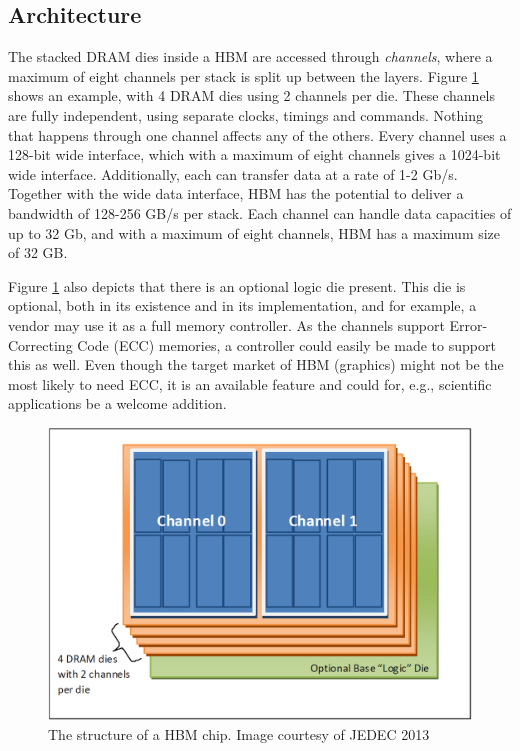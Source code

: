 \subsection{Architecture}
The stacked DRAM dies inside a HBM are accessed through \emph{channels}, where a maximum of eight channels per stack is split up between the layers. Figure \ref{HBM-structure} shows an example, with 4 DRAM dies using 2 channels per die. These channels are fully independent, using separate clocks, timings and commands. Nothing that happens through one channel affects any of the others. Every channel uses a 128-bit wide interface, which with a maximum of eight channels gives a 1024-bit wide interface. Additionally, each can transfer data at a rate of 1-2 Gb/s. Together with the wide data interface, HBM has the potential to deliver a bandwidth of 128-256 GB/s per stack. Each channel can handle data capacities of up to 32 Gb, and with a maximum of eight channels, HBM has a maximum size of 32 GB. 
\bigskip

Figure \ref{HBM-structure} also depicts that there is an optional logic die present. This die is optional, both in its existence and in its implementation, and for example, a vendor may use it as a full memory controller. As the channels support Error-Correcting Code (ECC) memories, a controller could easily be made to support this as well. Even though the target market of HBM (graphics) might not be the most likely to need ECC, it is an available feature and could for, e.g., scientific applications be a welcome addition. 

\begin{figure}[!h]
\centering
\includegraphics[width=0.75\linewidth]{figure/HBM_structure.PNG}
\caption{The structure of a HBM chip. Image courtesy of JEDEC 2013 }
\label{HBM-structure}
\end{figure}

